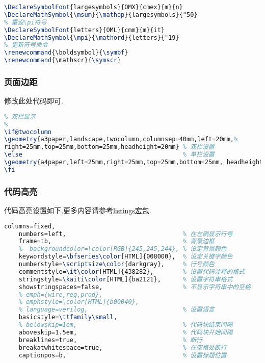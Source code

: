 \documentclass[list,answers,csize4,custom]{sysuexam}
\begin{document}
\begin{lstlisting}[title={\mt{sysuexam.cls}文件中\mt{\backslash{}msum}和\mt{\backslash{}mpi}}声明和更新命令,language=tex,firstnumber=182]
% 重设\sum符号
\DeclareSymbolFont{largesymbols}{OMX}{cmex}{m}{n}
\DeclareMathSymbol{\msum}{\mathop}{largesymbols}{"50}
% 重设\pi符号
\DeclareSymbolFont{letters}{OML}{cmm}{m}{it}
\DeclareMathSymbol{\mpi}{\mathord}{letters}{"19}
% 更新符号命令
\renewcommand{\boldsymbol}{\symbf}
\renewcommand{\mathscr}{\symscr}
\end{lstlisting}

\subsubsection{页面边距}
修改此处代码即可.
\begin{lstlisting}[title=页面边距设置,language=tex,firstnumber=271]
%
% 双栏显示
%
\if@twocolumn
\geometry{a3paper,landscape,twocolumn,columnsep=40mm,left=20mm,%
right=25mm,top=25mm,bottom=25mm,headheight=20mm} % 双栏设置
\else										     % 单栏设置
\geometry{a4paper,left=25mm,right=25mm,top=25mm,bottom=25mm, headheight=20mm}
\fi
\end{lstlisting}

\subsubsection{代码高亮}
代码高亮设置如下,更多内容请参考\href{http://texdoc.net/texmf-dist/doc/latex/listings/listings.pdf}{listings宏包}.
\begin{lstlisting}[title=代码高亮设置,language=tex,firstnumber=220]
    columns=fixed,
    numbers=left,                                % 在左侧显示行号
    frame=tb,                                    % 背景边框
    %  backgroundcolor=\color[RGB]{245,245,244}, % 设定背景颜色
    keywordstyle=\bfseries\color[HTML]{008000},  % 设定关键字颜色
    numberstyle=\scriptsize\color{darkgray},     % 行号颜色
    commentstyle=\it\color[HTML]{438282},        % 设置代码注释的格式
    stringstyle=\kaiti\color[HTML]{ba2121},      % 设置字符串格式
    showstringspaces=false,                      % 不显示字符串中的空格
    % emph={wire,reg,prod},
    % emphstyle=\color[HTML]{b00040},
    % language=verilog,                          % 设置语言
    basicstyle=\ttfamily\small,
    % belowskip=1em,                             % 代码块结束间隔 
    aboveskip=1.5em,                             % 代码块开始间隔 
    breaklines=true,                             % 断行
    breakatwhitespace=true,                      % 在空格处断行
    captionpos=b,                                % 设置标题位置
\end{lstlisting}
\end{document}
